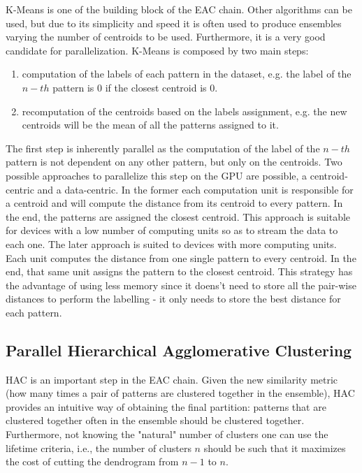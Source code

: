 K-Means is one of the building block of the EAC chain. Other algorithms can be used, but due to its simplicity and speed it is often used to produce ensembles varying the number of centroids to be used.
Furthermore, it is a very good candidate for parallelization. K-Means is composed by two main steps:

\begin{enumerate}
	\item computation of the labels of each pattern in the dataset, e.g. the label of the $n-th$ pattern is $0$ if the closest centroid is $0$.
	\item recomputation of the centroids based on the labels assignment, e.g. the new centroids will be the mean of all the patterns assigned to it.
\end{enumerate}

The first step is inherently parallel as the computation of the label of the $n-th$ pattern is not dependent on any other pattern, but only on the centroids. Two possible approaches to parallelize this step on the GPU are possible, a centroid-centric and a data-centric. In the former each computation unit is responsible for a centroid and will compute the distance from its centroid to every pattern. In the end, the patterns are assigned the closest centroid. This approach is suitable for devices with a low number of computing units so as to stream the data to each one.
The later approach is suited to devices with more computing units. Each unit computes the distance from one single pattern to every centroid. In the end, that same unit assigns the pattern to the closest centroid. This strategy has the advantage of using less memory since it doens't need to store all the pair-wise distances to perform the labelling - it only needs to store the best distance for each pattern.


\subsection{Parallel Hierarchical Agglomerative Clustering}

HAC is an important step in the EAC chain. Given the new similarity metric (how many times a pair of patterns are clustered together in the ensemble), HAC provides an intuitive way of obtaining the final partition: patterns that are clustered together often in the ensemble should be clustered together. Furthermore, not knowing the "natural" number of clusters one can use the lifetime criteria, i.e., the number of clusters $n$ should be such that it maximizes the cost of cutting the dendrogram from $n-1$ to $n$.

